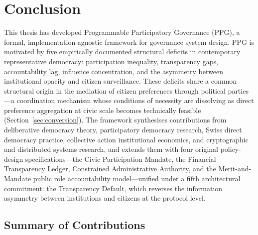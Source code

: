 \documentclass[12pt,a4paper,oneside]{report}
\begin{document}
\chapter{Conclusion}
\label{sec:conclusion}

This thesis has developed Programmable Participatory Governance (PPG), a formal, implementation-agnostic framework for governance system design. PPG is motivated by five empirically documented structural deficits in contemporary representative democracy: participation inequality, transparency gaps, accountability lag, influence concentration, and the asymmetry between institutional opacity and citizen surveillance. These deficits share a common structural origin in the mediation of citizen preferences through political parties---a coordination mechanism whose conditions of necessity are dissolving as direct preference aggregation at civic scale becomes technically feasible (Section~\ref{sec:conversion}). The framework synthesises contributions from deliberative democracy theory, participatory democracy research, Swiss direct democracy practice, collective action institutional economics, and cryptographic and distributed systems research, and extends them with four original policy-design specifications---the Civic Participation Mandate, the Financial Transparency Ledger, Constrained Administrative Authority, and the Merit-and-Mandate public role accountability model---unified under a fifth architectural commitment: the Transparency Default, which reverses the information asymmetry between institutions and citizens at the protocol level.

\section{Summary of Contributions}
\end{document}
